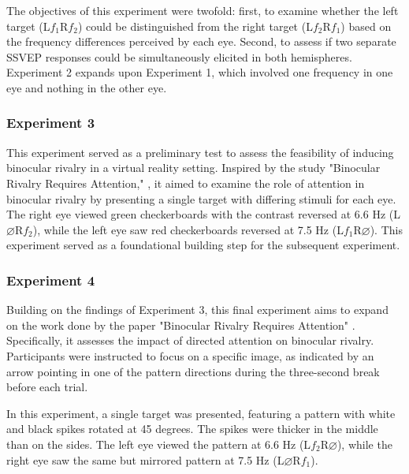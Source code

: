 The objectives of this experiment were twofold: first, to examine whether the left target (L$f_{1}$R$f_{2}$) could be distinguished from the right target (L$f_{2}$R$f_{1}$) based on the frequency differences perceived by each eye. Second, to assess if two separate SSVEP responses could be simultaneously elicited in both hemispheres. Experiment 2 expands upon Experiment 1, which involved one frequency in one eye and nothing in the other eye.

\subsubsection{Experiment 3}

This experiment served as a preliminary test to assess the feasibility of inducing binocular rivalry in a virtual reality setting. Inspired by the study "Binocular Rivalry Requires Attention," \cite{ZHANG2011362}, it aimed to examine the role of attention in binocular rivalry by presenting a single target with differing stimuli for each eye. The right eye viewed green checkerboards with the contrast reversed at 6.6 Hz (L$\varnothing$R$f_{2}$), while the left eye saw red checkerboards reversed at 7.5 Hz (L$f_{1}$R$\varnothing$). This experiment served as a foundational building step for the subsequent experiment.

\subsubsection{Experiment 4}

Building on the findings of Experiment 3, this final experiment aims to expand on the work done by the paper "Binocular Rivalry Requires Attention" \cite{ZHANG2011362}. Specifically, it assesses the impact of directed attention on binocular rivalry. Participants were instructed to focus on a specific image, as indicated by an arrow pointing in one of the pattern directions during the three-second break before each trial.

In this experiment, a single target was presented, featuring a pattern with white and black spikes rotated at 45 degrees. The spikes were thicker in the middle than on the sides. The left eye viewed the pattern at 6.6 Hz (L$f_{2}$R$\varnothing$), while the right eye saw the same but mirrored pattern at 7.5 Hz (L$\varnothing$R$f_{1}$).

